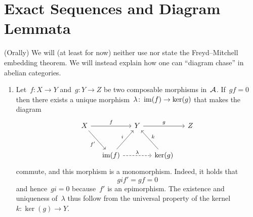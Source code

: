\section{Exact Sequences and Diagram Lemmata}


\begin{remarknonum}(Orally)
  We will (at least for now) neither use nor state the Freyd--Mitchell embedding theorem.
  We will instead explain how one can \enquote{diagram chase} in abelian categories.
\end{remarknonum}


\begin{remarkdefinition}
  \leavevmode
  \begin{enumerate}
    \item
      Let~$f \colon X \to Y$ and~$g \colon Y \to Z$ be two composable morphisms in~$\mathcal{A}$.
      If~$g f = 0$ then there exists a unique morphism~$\lambda \colon \operatorname{im}(f) \to \ker(g)$ that makes the diagram
      \[
        \begin{tikzcd}[column sep = small, row sep = large]
            X
            \arrow{rr}[above]{f}
            \arrow{dr}[below left]{f'}
          & {}
          & Y
            \arrow{rr}[above]{g}
          & {}
          & Z
          \\
            {}
          & \im(f)
            \arrow{ur}[above left]{i}
            \arrow[dashed]{rr}[above]{\lambda}
          & {}
          & \ker(g)
            \arrow{ul}[above right]{k}
          & {}
        \end{tikzcd}
      \]
      commute, and this morphism is a monomorphism.
      Indeed, it holds that
      \[
          g i f'
        = g f
        = 0
      \]
      and hence~$g i = 0$ because~$f'$ is an epimorphism.
      The existence and uniqueness of~$\lambda$ thus follow from the universal property of the kernel~$k \colon \ker(g) \to Y$.
      

\end{enumerate}
\end{remarkdefinition}
